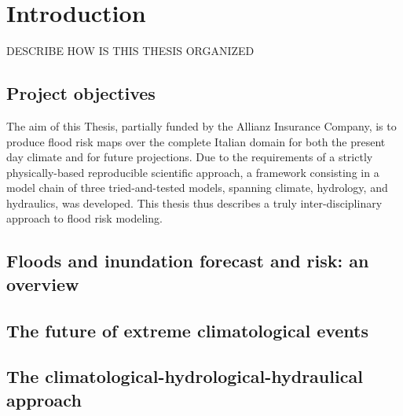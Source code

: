 \chapter{Introduction}
DESCRIBE HOW IS THIS THESIS ORGANIZED

\section{Project objectives}
The aim of this Thesis, partially funded by the Allianz Insurance Company, is to produce flood risk maps over the complete Italian domain for both the present day climate and for future projections. Due to the requirements of a strictly physically-based reproducible scientific approach, a framework consisting in a model chain of three tried-and-tested models, spanning climate, hydrology, and hydraulics, was developed. This thesis thus describes a truly inter-disciplinary approach to flood risk modeling.

\section{Floods and inundation forecast and risk: an overview}

\section{The future of extreme climatological events}

\section{The climatological-hydrological-hydraulical approach}
